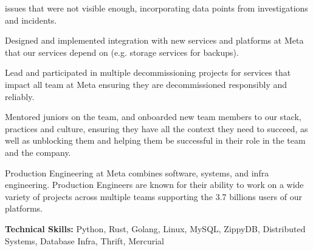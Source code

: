 \begin{cventries}
{\begin{cvitems}
{			            issues that were not visible enough, incorporating data points from investigations and incidents.}
			\item {Designed and implemented integration with new services and platforms at Meta that our services depend on
			            (e.g. storage services for backups).}
			\item {Lead and participated in multiple decommissioning projects for services that impact all team at Meta
			            ensuring they are decommissioned responsibly and reliably.}
			\item {Mentored juniors on the team, and onboarded new team members to our stack, practices and culture, ensuring
			            they have all the context they need to succeed, as well as unblocking them and helping them be
			            successful in their role in the team and the company.}
			\item {Production Engineering at Meta combines software, systems, and infra engineering. Production Engineers are
			            known for their ability to work on a wide variety of projects across multiple teams supporting the 3.7
			            billions users of our platforms.}
			\item {\textbf{Technical Skills:} Python, Rust, Golang, Linux, MySQL, ZippyDB, Distributed Systems, Database Infra,
			            Thrift, Mercurial}
		\end{cvitems}
	}


\end{cventries}
